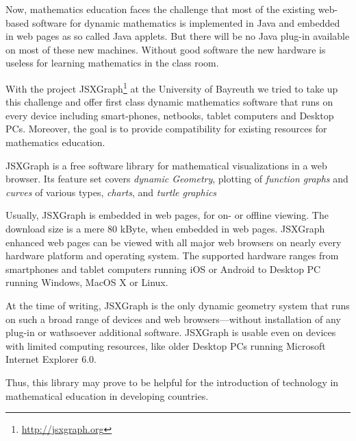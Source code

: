 \documentclass[12pt,a4paper]{article}%
\begin{document}
Now, mathematics education faces the challenge that most of the existing web-based software 
for dynamic mathematics is implemented in Java and embedded in web pages as so called Java applets.  
But there will be no Java plug-in available on most of these new machines. 
Without good software the new hardware is useless for learning mathematics 
in the class room.

With the project JSXGraph\footnote{\href{http://jsxgraph.org}{http://jsxgraph.org}} 
at the University of Bayreuth we tried to take up 
this challenge and offer first class dynamic mathematics software that runs on 
every device including smart-phones, netbooks, tablet computers and Desktop PCs. 
Moreover, the goal is to provide compatibility for existing resources for 
mathematics education. 

JSXGraph is a free software library for mathematical visualizations in a web browser.
Its feature set covers {\sl dynamic Geometry}, plotting of {\sl function graphs} and
{\sl curves} of various types, {\sl charts}, and {\sl turtle graphics}

Usually, JSXGraph is embedded in web pages, for on- or off\/line viewing.
The download size is a mere 80 kByte, when embedded in web pages.
JSXGraph enhanced web pages can be viewed with all major web browsers 
on nearly every hardware platform and operating system.
The supported hardware ranges from smartphones and tablet computers 
running iOS or Android to Desktop PC running Windows, MacOS X or Linux.

At the time of writing, JSXGraph is the only dynamic geometry system that runs  
on such a broad range of  devices and web browsers---without installation of any plug-in 
or wathsoever additional software.
JSXGraph is usable even on devices with limited computing resources, 
like older Desktop PCs running Microsoft Internet Explorer 6.0. 

Thus, this library may prove to be helpful for the
introduction of technology in mathematical education in developing countries.
\end{document}

